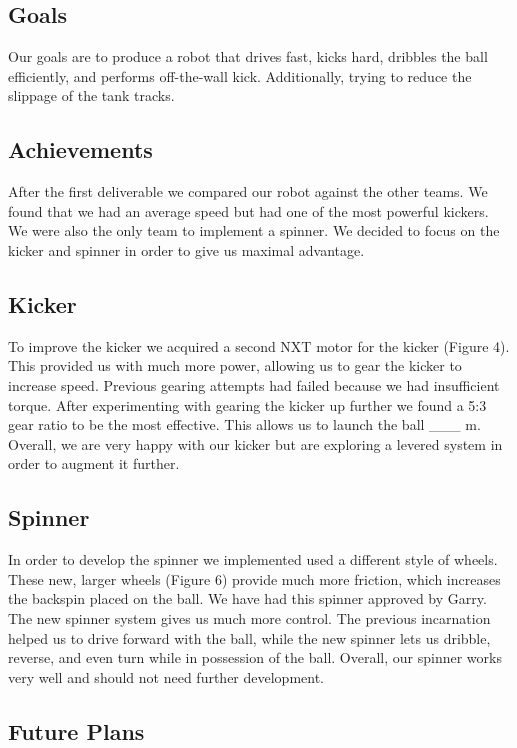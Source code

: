 \documentclass[12pt, a4paper, titlepage]{article}
\begin{document}
\subsection{Goals}

Our goals are to produce a robot that drives fast, kicks hard, dribbles the ball
efficiently, and performs off-the-wall kick. Additionally, trying to reduce the
slippage of the tank tracks.

\subsection{Achievements}

After the first deliverable we compared our robot against the other teams. We
found that we had an average speed but had one of the most powerful kickers.
We were also the only team to implement a spinner. We decided to focus on the
kicker and spinner in order to give us maximal advantage.

\subsection{Kicker}

To improve the kicker we acquired a second NXT motor for the kicker (Figure
4). This provided us with much more power, allowing us to gear the kicker to
increase speed. Previous gearing attempts had failed because we had insufficient
torque. After experimenting with gearing the kicker up further we found a 5:3
gear ratio to be the most effective. This allows us to launch the ball \_\_\_ m.
Overall, we are very happy with our kicker but are exploring a levered system in
order to augment it further.

\subsection{Spinner}

In order to develop the spinner we implemented used a different style of wheels.
These new, larger wheels (Figure 6) provide much more friction, which increases
the backspin placed on the ball. We have had this spinner approved by Garry.
The new spinner system gives us much more control. The previous incarnation
helped us to drive forward with the ball, while the new spinner lets us dribble,
reverse, and even turn while in possession of the ball. Overall, our spinner
works very well and should not need further development.

\subsection{Future Plans}
\end{document}
